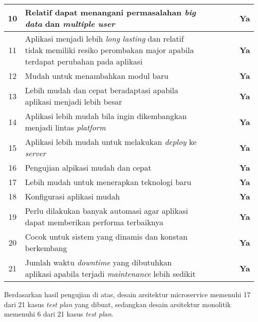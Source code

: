 \begin{adjustbox}{width=1\textwidth}
	\begin{tabular}{|p{1cm}|p{8.5cm}|p{1cm}|p{1cm}|p{1cm}|p{1cm}|p{1cm}|}
		\hline
		\multicolumn{1}{|c|}{10}&Relatif dapat menangani permasalahan \textit{big data} dan \textit{multiple user}&\checkmark&&&\checkmark&\multicolumn{1}{c|}{\textbf{Ya}}\\ \hline
		\multicolumn{1}{|c|}{11}&Aplikasi menjadi lebih \textit{long lasting} dan relatif tidak memiliki resiko perombakan major apabila terdapat perubahan pada aplikasi&\checkmark&&&\checkmark&\multicolumn{1}{c|}{\textbf{Ya}}\\ \hline
		\multicolumn{1}{|c|}{12}&Mudah untuk menambahkan modul baru&\checkmark&&\checkmark&&\multicolumn{1}{c|}{\textbf{Ya}}\\ \hline
		\multicolumn{1}{|c|}{13}&Lebih mudah dan cepat beradaptasi apabila aplikasi menjadi lebih besar&\checkmark&&&\checkmark&\multicolumn{1}{c|}{\textbf{Ya}}\\ \hline
		\multicolumn{1}{|c|}{14}&Aplikasi lebih mudah bila ingin dikembangkan menjadi lintas \textit{platform}&\checkmark&&&\checkmark&\multicolumn{1}{c|}{\textbf{Ya}}\\ \hline
		\multicolumn{1}{|c|}{15}&Aplikasi lebih mudah untuk melakukan \textit{deploy} ke \textit{server}&\checkmark&&&\checkmark&\multicolumn{1}{c|}{\textbf{Ya}}\\ \hline
		\multicolumn{1}{|c|}{16}&Pengujian alpikasi mudah dan cepat&\checkmark&&\checkmark&&\multicolumn{1}{c|}{\textbf{Ya}}\\ \hline
		\multicolumn{1}{|c|}{17}&Lebih mudah untuk menerapkan teknologi baru&\checkmark&&&\checkmark&\multicolumn{1}{c|}{\textbf{Ya}}\\ \hline
		\multicolumn{1}{|c|}{18}&Konfigurasi aplikasi mudah&&\checkmark&\checkmark&&\multicolumn{1}{c|}{\textbf{Ya}}\\ \hline
		\multicolumn{1}{|c|}{19}&Perlu dilakukan banyak automasi agar aplikasi dapat memberikan performa terbaiknya&&\checkmark&\checkmark&&\multicolumn{1}{c|}{\textbf{Ya}}\\ \hline
		\multicolumn{1}{|c|}{20}&Cocok untuk sistem yang dinamis dan konstan berkembang&\checkmark&&&\checkmark&\multicolumn{1}{c|}{\textbf{Ya}}\\ \hline
		\multicolumn{1}{|c|}{21}&Jumlah waktu \textit{downtime} yang dibutuhkan aplikasi apabila terjadi \textit{maintenance} lebih sedikit&\checkmark&&&\checkmark&\multicolumn{1}{c|}{\textbf{Ya}}\\ \hline
	\end{tabular}
\end{adjustbox}

Berdasarkan hasil pengujian di atas, desain arsitektur microservice memenuhi 17 dari 21 kasus \textit{test plan} yang dibuat, sedangkan desain arsitektur monolitik memenuhi 6 dari 21 kasus \textit{test plan}.
\newpage